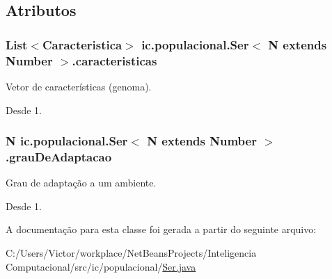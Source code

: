 \subsection{Atributos}
\hypertarget{classic_1_1populacional_1_1_ser_3_01_n_01extends_01_number_01_4_a2006e8efb9bf95aa5e6b04a294c4f171}{
\subsubsection[{caracteristicas}]{\setlength{\rightskip}{0pt plus 5cm}List$<${\bf Caracteristica}$>$ ic.\-populacional.\-Ser$<$ N extends Number $>$.caracteristicas\hspace{0.3cm}{\ttfamily [protected]}}}\label{classic_1_1populacional_1_1_ser_3_01_n_01extends_01_number_01_4_a2006e8efb9bf95aa5e6b04a294c4f171}


Vetor de {\ttfamily características} (genoma). 

\begin{DoxySince}{Desde}
1. 
\end{DoxySince}
\hypertarget{classic_1_1populacional_1_1_ser_3_01_n_01extends_01_number_01_4_a9f4bec4ec52f681cc2fe57e04bdb6c4e}{
\subsubsection[{grau\-De\-Adaptacao}]{\setlength{\rightskip}{0pt plus 5cm}N ic.\-populacional.\-Ser$<$ N extends Number $>$.grau\-De\-Adaptacao\hspace{0.3cm}{\ttfamily [protected]}}}\label{classic_1_1populacional_1_1_ser_3_01_n_01extends_01_number_01_4_a9f4bec4ec52f681cc2fe57e04bdb6c4e}


Grau de adaptação a um ambiente. 

\begin{DoxySince}{Desde}
1. 
\end{DoxySince}


A documentação para esta classe foi gerada a partir do seguinte arquivo\-:\begin{DoxyCompactItemize}
\item 
C\-:/\-Users/\-Victor/workplace/\-Net\-Beans\-Projects/\-Inteligencia Computacional/src/ic/populacional/\hyperlink{_ser_8java}{Ser.\-java}\end{DoxyCompactItemize}
